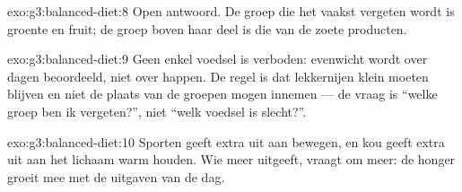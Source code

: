 \begin{solution}{exo:g3:balanced-diet:8}
Open antwoord. De groep die het vaakst vergeten wordt is groente en
fruit; de groep boven haar deel is die van de zoete producten.
\end{solution}

\begin{solution}{exo:g3:balanced-diet:9}
Geen enkel voedsel is verboden: evenwicht wordt over dagen beoordeeld,
niet over happen. De regel is dat lekkernijen klein moeten blijven en
niet de plaats van de groepen mogen innemen --- de vraag is ``welke
groep ben ik vergeten?'', niet ``welk voedsel is slecht?''.
\end{solution}

\begin{solution}{exo:g3:balanced-diet:10}
Sporten geeft extra  uit aan bewegen, en kou geeft extra 
uit aan het lichaam warm houden. Wie meer uitgeeft, vraagt om meer: de
honger groeit mee met de uitgaven van de dag.
\end{solution}
